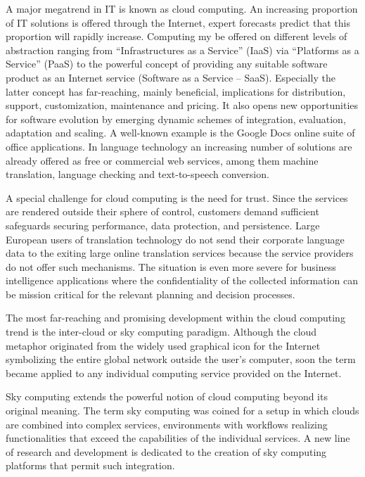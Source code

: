 \begin{multicols}{2}
A major megatrend in IT is known as cloud computing.  An increasing proportion of IT solutions is offered through the Internet, expert forecasts predict that this proportion will rapidly increase.  Computing my be offered on different levels of abstraction ranging from “Infrastructures as a Service” (IaaS) via “Platforms as a Service” (PaaS) to the powerful concept of providing any suitable software product as an Internet service (Software as a Service – SaaS). Especially the latter concept has far-reaching, mainly beneficial, implications for distribution, support, customization, maintenance and pricing. It also opens new opportunities for software evolution by emerging dynamic schemes of integration, evaluation, adaptation and scaling. A well-known example is the Google Docs online suite of office applications. In language technology an increasing number of solutions are already offered as free or commercial web services, among them machine translation, language checking and text-to-speech conversion.

A special challenge for cloud computing is the need for trust. Since the services are rendered outside their sphere of control, customers demand sufficient safeguards securing performance, data protection, and persistence. Large European users of translation technology do not send their corporate language data to the exiting large online translation services because the service providers do not offer such mechanisms. The situation is even more severe for business intelligence applications where the confidentiality of the collected information can be mission critical for the relevant planning and decision processes.  

The most far-reaching and promising development within the cloud computing trend is the inter-cloud or sky computing paradigm.  Although the cloud metaphor originated from the widely used graphical icon for the Internet symbolizing the entire global network outside the user’s computer, soon the term became applied to any individual computing service provided on the Internet.  

Sky computing extends the powerful notion of cloud computing beyond its original meaning.  The term sky computing was coined for a setup in which clouds are combined into complex services, environments with workflows realizing functionalities that exceed the capabilities of the individual services.
A new line of research and development is dedicated to the creation of sky computing platforms that permit such integration. 


\end{multicols}

